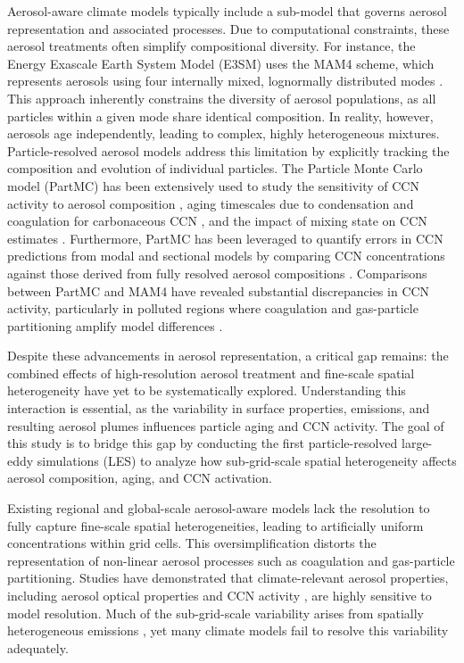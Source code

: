 \documentclass[journal abbreviation, manuscript]{copernicus}
\begin{document}
Aerosol-aware climate models typically include a sub-model that
governs aerosol representation and associated processes. Due to
computational constraints, these aerosol treatments often simplify
compositional diversity. For instance, the Energy Exascale Earth
System Model (E3SM) uses the MAM4 scheme, which represents aerosols
using four internally mixed, lognormally distributed modes
\citep{golaz_doe_2022}. This approach inherently constrains the
diversity of aerosol populations, as all particles within a given mode
share identical composition. In reality, however, aerosols age
independently, leading to complex, highly heterogeneous
mixtures. Particle-resolved aerosol models address this limitation by
explicitly tracking the composition and evolution of individual
particles. The Particle Monte Carlo model (PartMC) has been
extensively used to study the sensitivity of CCN activity to aerosol
composition \citep{fierce_when_2013}, aging timescales due to
condensation and coagulation for carbonaceous CCN
\citep{fierce_explaining_2015}, and the impact of mixing state on CCN
estimates \citep{ching_metrics_2017}. Furthermore, PartMC has been
leveraged to quantify errors in CCN predictions from modal and
sectional models by comparing CCN concentrations against those derived
from fully resolved aerosol compositions
\citep{zaveri_particle-resolved_2010, ching_metrics_2017}. Comparisons
between PartMC and MAM4 have revealed substantial discrepancies in CCN
activity, particularly in polluted regions where coagulation and
gas-particle partitioning amplify model differences
\citep{fierce_quantifying_2024}.

Despite these advancements in aerosol representation, a critical gap
remains: the combined effects of high-resolution aerosol treatment and
fine-scale spatial heterogeneity have yet to be systematically
explored. Understanding this interaction is essential, as the
variability in surface properties, emissions, and resulting aerosol
plumes influences particle aging and CCN activity. The goal of this
study is to bridge this gap by conducting the first particle-resolved
large-eddy simulations (LES) to analyze how sub-grid-scale spatial
heterogeneity affects aerosol composition, aging, and CCN activation.

Existing regional and global-scale aerosol-aware models lack the
resolution to fully capture fine-scale spatial heterogeneities,
leading to artificially uniform concentrations within grid cells. This
oversimplification distorts the representation of non-linear aerosol
processes such as coagulation and gas-particle partitioning. Studies
have demonstrated that climate-relevant aerosol properties, including
aerosol optical properties \citep{gustafson_jr_downscaling_2011} and
CCN activity \citep{weigum_effect_2016}, are highly sensitive to model
resolution. Much of the sub-grid-scale variability arises from
spatially heterogeneous emissions \citep{qian_investigation_2010}, yet
many climate models fail to resolve this variability adequately.
\end{document}
